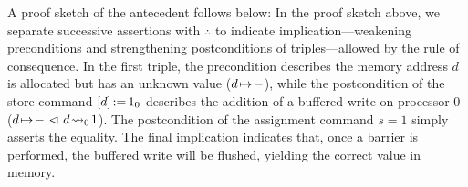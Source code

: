 \documentclass[11pt]{report}
\begin{document}
A proof sketch of the antecedent follows below: 
 In the proof sketch above, we separate successive assertions with $\therefore$ to indicate implication---weakening preconditions and strengthening postconditions of triples---allowed by the rule of consequence. In the first triple, the precondition describes the memory address $d$ is allocated but has an unknown value ($d \!\mapsto\! -$), while the postcondition of the store command $\left[ d \right] \operatorname{:\!=} 1_0$ describes the addition of a buffered write on processor 0 ($d \!\mapsto\! - \operatorname{\,\vartriangleleft\,} d \!\leadsto_{0}\! 1$). The postcondition of the assignment command $s = 1$ simply asserts the equality. The final implication  indicates that, once a barrier is performed, the buffered write will be flushed, yielding the correct value in memory.  
\end{document}
